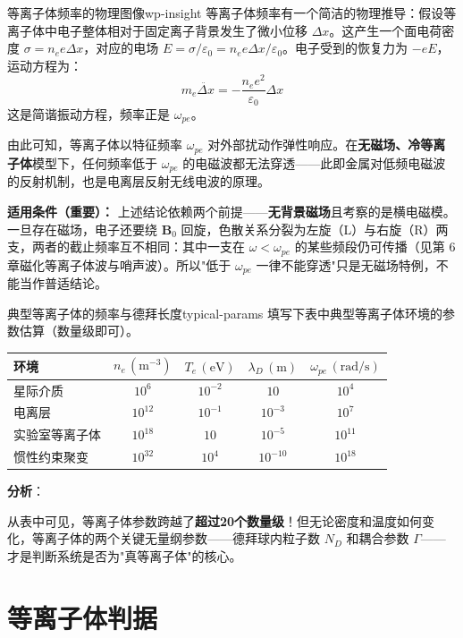\documentclass[12pt,a4paper,openany,oneside]{book}
\newcommand{\eps}{\varepsilon}
\newcommand{\vect}[1]{\bm{#1}}
\newcommand{\difficulty}[1]{\marginnote{\hfill\textcolor{coverMid!80}{\rule[-0.1em]{2pt}{0.9em}}\,\textcolor{coverMid}{\footnotesize\textbf{[#1]}}}}
\begin{document}
\begin{insight}{等离子体频率的物理图像}{wp-insight}
等离子体频率有一个简洁的物理推导：假设等离子体中电子整体相对于固定离子背景发生了微小位移 $\Delta x$。这产生一个面电荷密度 $\sigma = n_e e \Delta x$，对应的电场 $E = \sigma/\eps_0 = n_e e \Delta x/\eps_0$。电子受到的恢复力为 $-eE$，运动方程为：
\[
m_e \ddot{\Delta x} = -\frac{n_e e^2}{\eps_0}\Delta x
\]
这是简谐振动方程，频率正是 $\omega_{pe}$。

由此可知，等离子体以特征频率 $\omega_{pe}$ 对外部扰动作弹性响应。在\textbf{无磁场、冷等离子体}模型下，任何频率低于 $\omega_{pe}$ 的电磁波都无法穿透——此即金属对低频电磁波的反射机制，也是电离层反射无线电波的原理。

\textbf{适用条件（重要）：} 上述结论依赖两个前提——\textbf{无背景磁场}且考察的是横电磁模。一旦存在磁场，电子还要绕 $\vect{B}_0$ 回旋，色散关系分裂为左旋（L）与右旋（R）两支，两者的截止频率互不相同：其中一支在 $\omega<\omega_{pe}$ 的某些频段仍可传播（见第 6 章磁化等离子体波与哨声波）。所以"低于 $\omega_{pe}$ 一律不能穿透"只是无磁场特例，不能当作普适结论。
\end{insight}

\begin{example}{典型等离子体的频率与德拜长度}{typical-params}
\difficulty{基础}
填写下表中典型等离子体环境的参数估算（数量级即可）。
\begin{center}
\begin{tabular}{lcccc}
\toprule
\textbf{环境} & $n_e\,(\mathrm{m}^{-3})$ & $T_e\,(\mathrm{eV})$ & $\lambda_D\,(\mathrm{m})$ & $\omega_{pe}\,(\mathrm{rad/s})$ \\
\midrule
星际介质 & $10^6$ & $10^{-2}$ & $10$ & $10^4$ \\
电离层 & $10^{12}$ & $10^{-1}$ & $10^{-3}$ & $10^7$ \\
实验室等离子体 & $10^{18}$ & $10$ & $10^{-5}$ & $10^{11}$ \\
惯性约束聚变 & $10^{32}$ & $10^4$ & $10^{-10}$ & $10^{18}$ \\
\bottomrule
\end{tabular}
\end{center}
\tcblower
\textbf{分析}：

从表中可见，等离子体参数跨越了\textbf{超过20个数量级}！但无论密度和温度如何变化，等离子体的两个关键无量纲参数——德拜球内粒子数 $N_D$ 和耦合参数 $\Gamma$——才是判断系统是否为"真等离子体"的核心。
\end{example}

\section{等离子体判据}\difficulty{基础}
\end{document}
